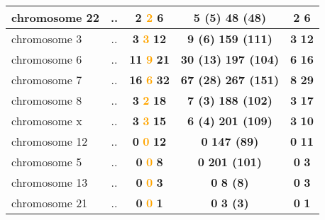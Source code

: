 \begin{table}[H]
\begin{tabular}{||l|c|c|c|c||}
\hline
chromosome 22&..&\textcolor{vert}{\textbf{2}} \textcolor{orange}{\textbf{2}} \textcolor{rose}{\textbf{6}} &\textcolor{vert}{\textbf{5 (5)}} \textcolor{rose}{\textbf{48 (48)}} &\textcolor{vert}{\textbf{2}} \textcolor{rose}{\textbf{6}} \\
\hline
chromosome 3&..&\textcolor{vert}{\textbf{3}} \textcolor{orange}{\textbf{3}} \textcolor{rose}{\textbf{12}} &\textcolor{vert}{\textbf{9 (6)}} \textcolor{rose}{\textbf{159 (111)}} &\textcolor{vert}{\textbf{3}} \textcolor{rose}{\textbf{12}} \\
\hline
chromosome 6&..&\textcolor{vert}{\textbf{11}} \textcolor{orange}{\textbf{9}} \textcolor{rose}{\textbf{21}} &\textcolor{vert}{\textbf{30 (13)}} \textcolor{rose}{\textbf{197 (104)}} &\textcolor{vert}{\textbf{6}} \textcolor{rose}{\textbf{16}} \\
\hline
chromosome 7&..&\textcolor{vert}{\textbf{16}} \textcolor{orange}{\textbf{6}} \textcolor{rose}{\textbf{32}} &\textcolor{vert}{\textbf{67 (28)}} \textcolor{rose}{\textbf{267 (151)}} &\textcolor{vert}{\textbf{8}} \textcolor{rose}{\textbf{29}} \\
\hline
chromosome 8&..&\textcolor{vert}{\textbf{3}} \textcolor{orange}{\textbf{2}} \textcolor{rose}{\textbf{18}} &\textcolor{vert}{\textbf{7 (3)}} \textcolor{rose}{\textbf{188 (102)}} &\textcolor{vert}{\textbf{3}} \textcolor{rose}{\textbf{17}} \\
\hline
chromosome x&..&\textcolor{vert}{\textbf{3}} \textcolor{orange}{\textbf{3}} \textcolor{rose}{\textbf{15}} &\textcolor{vert}{\textbf{6 (4)}} \textcolor{rose}{\textbf{201 (109)}} &\textcolor{vert}{\textbf{3}} \textcolor{rose}{\textbf{10}} \\
\hline
chromosome 12&..&\textcolor{vert}{\textbf{0}} \textcolor{orange}{\textbf{0}} \textcolor{rose}{\textbf{12}} &\textcolor{vert}{\textbf{0}} \textcolor{rose}{\textbf{147 (89)}} &\textcolor{vert}{\textbf{0}} \textcolor{rose}{\textbf{11}} \\
\hline
chromosome 5&..&\textcolor{vert}{\textbf{0}} \textcolor{orange}{\textbf{0}} \textcolor{rose}{\textbf{8}} &\textcolor{vert}{\textbf{0}} \textcolor{rose}{\textbf{201 (101)}} &\textcolor{vert}{\textbf{0}} \textcolor{rose}{\textbf{3}} \\
\hline
chromosome 13&..&\textcolor{vert}{\textbf{0}} \textcolor{orange}{\textbf{0}} \textcolor{rose}{\textbf{3}} &\textcolor{vert}{\textbf{0}} \textcolor{rose}{\textbf{8 (8)}} &\textcolor{vert}{\textbf{0}} \textcolor{rose}{\textbf{3}} \\
\hline
chromosome 21&..&\textcolor{vert}{\textbf{0}} \textcolor{orange}{\textbf{0}} \textcolor{rose}{\textbf{1}} &\textcolor{vert}{\textbf{0}} \textcolor{rose}{\textbf{3 (3)}} &\textcolor{vert}{\textbf{0}} \textcolor{rose}{\textbf{1}} \\

\end{tabular}
\end{table}
